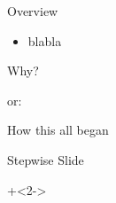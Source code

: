 \begin{frame}[fragile]{Overview}

\begin{itemize}
\item blabla
\end{itemize}

\end{frame}

\begin{frame}[fragile]{}

\begin{center}
{
\LARGE
Why?
}

\vspace{2em}

or:

\vspace{2em}

{
\Large
How this all began
}
\end{center}
\end{frame}

\begin{frame}[fragile]{Stepwise Slide}

\begin{center}
\end{center}

\vspace{2em}

\onslide+<2->

\end{frame}


